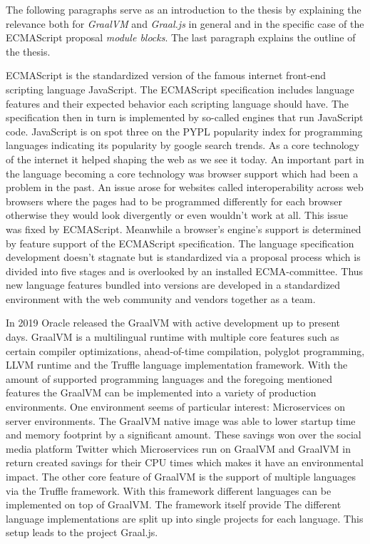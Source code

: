 The following paragraphs serve as an introduction to the thesis by explaining the relevance both for \emph{GraalVM} and \emph{Graal.js} in general and in the specific case of the ECMAScript proposal \emph{module blocks}. The last paragraph explains the outline of the thesis.

ECMAScript is the standardized version of the famous internet front-end scripting language JavaScript.  The ECMAScript specification includes language features and their expected behavior each scripting language should have. The specification then in turn is implemented by so-called engines that run JavaScript code. JavaScript is on spot three on the PYPL popularity index for programming languages indicating its popularity by google search trends. \cite{pypl} As a core technology of the internet it helped shaping the web as we see it today. An important part in the language becoming a core technology was browser support which had been a problem in the past. An issue arose for websites called interoperability across web browsers where the pages had to be programmed differently for each browser otherwise they would look divergently or even wouldn't work at all. \cite{10.1145/3386327} This issue was fixed by ECMAScript. Meanwhile a browser's engine's support is determined by feature support of the ECMAScript specification. The language specification development doesn't stagnate but is standardized via a proposal process which is divided into five stages and is overlooked by an installed ECMA-committee. Thus new language features bundled into versions are developed in a standardized environment with the web community and vendors together as a team. \cite{ecma}

In 2019 Oracle released the GraalVM with active development up to present days. GraalVM is a multilingual runtime with multiple core features such as certain compiler optimizations, ahead-of-time compilation, polyglot programming, LLVM runtime and the Truffle language implementation framework. With the amount of supported programming languages and the foregoing mentioned features the GraalVM can be implemented into a variety of production environments. One environment seems of particular interest: Microservices on server environments. The GraalVM native image was able to lower startup time and memory footprint by a significant amount. \cite{graalVMNative} These savings won over the social media platform Twitter which Microservices run on GraalVM and GraalVM in return created savings for their CPU times which makes it have an environmental impact. The other core feature of GraalVM is the support of multiple languages via the Truffle framework. With this framework different languages can be implemented on top of GraalVM. \cite{graalVMStart}\cite{graalVMIntro} The framework itself provide The different language implementations are split up into single projects for each language. This setup leads to the project Graal.js.

